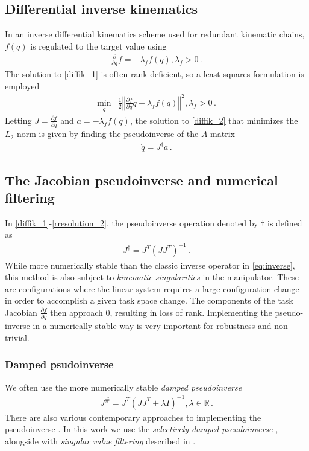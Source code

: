 \documentclass[times, utf8, diplomski, english]{fer}
\begin{document}
\subsection{Differential inverse kinematics}
In an inverse differential kinematics scheme used for redundant kinematic chains, $f\left(q\right)$ is regulated to the target value using
\begin{align}
\label{diffik_1}
\frac{\partial}{\partial q}f = -\lambda_{f}f\left(q\right), \lambda_{f} > 0 \, .
\end{align}
The solution to \eqref{diffik_1} is often rank-deficient, so a least squares formulation is employed
\begin{align}
\label{diffik_2}
\min\limits_{\dot{q}} & \frac{1}{2}\left\Vert\frac{\partial f}{\partial q} \dot{q} + \lambda_{f}f\left(q\right)\right\Vert^2, \lambda_{f} > 0 \, .
\end{align}
Letting $J = \frac{\partial f}{\partial q}$ and $a = -\lambda_{f}f\left(q\right)$, the solution to \eqref{diffik_2} that minimizes the $L_{2}$ norm is given by finding the pseudoinverse of the $A$ matrix
\begin{align}
\label{diffik_4}
\dot{q} = J^{\dagger}a  \, .
\end{align}
\subsection{The Jacobian pseudoinverse and numerical filtering}
In \eqref{diffik_1}-\eqref{rresolution_2}, the pseudoinverse operation denoted by $\dagger$ is defined as 
\begin{align}
J^{\dagger} = J^T\left(JJ^T\right)^{-1}\, .
\end{align}
While more numerically stable than the classic inverse operator in \eqref{eq:inverse}, this method is also subject to \textit{kinematic singularities} in the manipulator.
These are configurations where the linear system requires a large configuration change in order to accomplish a given task space change.
The components of the task Jacobian $\frac{\partial f}{\partial q}$ then approach 0, resulting in loss of rank.
Implementing the pseudo-inverse in a numerically stable way is very important for robustness and non-trivial.
\subsubsection{Damped psudoinverse}
We often use the more numerically stable \textit{damped pseudoinverse} \citep{chan1988general}
\begin{align}
J^{\#} = J^T\left(JJ^T + \lambda I\right)^{-1} ,  \lambda \in \mathbb{R}\, .
\end{align}
There are also various contemporary approaches to implementing the pseudoinverse \citep{chiaverini1994review}. 
In this work we use the \textit{selectively damped pseudoinverse} \citep{buss2005selectively}, alongside with \textit{singular value filtering} described in \citep{colome2015closed}.
\end{document}
